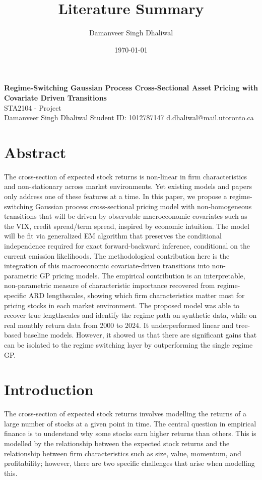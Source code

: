\documentclass[11pt]{article}
\title{Literature Summary}
\author{Damanveer Singh Dhaliwal}
\date{\today}
\begin{document}
\begin{center}
{\textbf{Regime-Switching Gaussian Process Cross-Sectional Asset Pricing with Covariate Driven Transitions} \\
STA2104 - Project \\[2pt]
Damanveer Singh Dhaliwal \quad Student ID: 1012787147 \quad d.dhaliwal@mail.utoronto.ca}
\end{center}

\section{Abstract}
The cross-section of expected stock returns is non-linear in firm characteristics and non-stationary across market environments. Yet existing models and papers only address one of these features at a time. In this paper, we propose a regime-switching Gaussian process cross-sectional pricing model with non-homogeneous transitions that will be driven by observable macroeconomic covariates such as the VIX, credit spread/term spread, inspired by economic intuition. The model will be fit via generalized EM algorithm that preserves the conditional independence required for exact forward-backward inference, conditional on the current emission likelihoods. The methodological contribution here is the integration of this macroeconomic covariate-driven transitions into non-parametric GP pricing models. The empirical contribution is an interpretable, non-parametric measure of characteristic importance recovered from regime-specific ARD lengthscales, showing which firm characteristics matter most for pricing stocks in each market environment. The proposed model was able to recover true lengthscales and identify the regime path on synthetic data, while on real monthly return data from 2000 to 2024. It underperformed linear and tree-based baseline models. However, it showed us that there are significant gains that can be isolated to the regime switching layer by outperforming the single regime GP. 

\section{Introduction}
The cross-section of expected stock returns involves modelling the returns of a large number of stocks at a given point in time. The central question in empirical finance is to understand why some stocks earn higher returns than others. This is modelled by the relationship between the expected stock returns and the relationship between firm characteristics such as size, value, momentum, and profitability; however, there are two specific challenges that arise when modelling this. 
\end{document}
